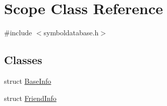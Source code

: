 \hypertarget{class_scope}{\section{Scope Class Reference}
\label{class_scope}
}


{\ttfamily \#include $<$symboldatabase.\-h$>$}

\subsection*{Classes}
\begin{DoxyCompactItemize}
\item 
struct \hyperlink{struct_scope_1_1_base_info}{Base\-Info}
\item 
struct \hyperlink{struct_scope_1_1_friend_info}{Friend\-Info}
\end{DoxyCompactItemize}
